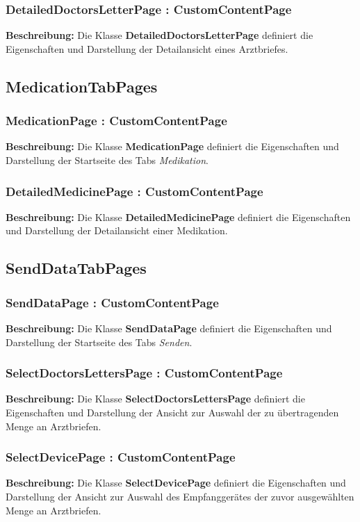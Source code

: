 \documentclass[a4paper]{scrreprt}
\begin{document}
\subsubsection{DetailedDoctorsLetterPage : CustomContentPage}
\textbf{Beschreibung:} Die Klasse \textbf{DetailedDoctorsLetterPage} definiert die Eigenschaften und Darstellung der Detailansicht eines Arztbriefes.

\subsection{MedicationTabPages}
\subsubsection{MedicationPage : CustomContentPage}
\textbf{Beschreibung:} Die Klasse \textbf{MedicationPage} definiert die Eigenschaften und Darstellung der Startseite des Tabs \textit{Medikation}.

\subsubsection{DetailedMedicinePage : CustomContentPage}
\textbf{Beschreibung:} Die Klasse \textbf{DetailedMedicinePage} definiert die Eigenschaften und Darstellung der Detailansicht einer Medikation.

\subsection{SendDataTabPages}
\subsubsection{SendDataPage : CustomContentPage}
\textbf{Beschreibung:} Die Klasse \textbf{SendDataPage} definiert die Eigenschaften und Darstellung der Startseite des Tabs \textit{Senden}.

\subsubsection{SelectDoctorsLettersPage : CustomContentPage}
\textbf{Beschreibung:} Die Klasse \textbf{SelectDoctorsLettersPage} definiert die Eigenschaften und Darstellung der Ansicht zur Auswahl der zu übertragenden Menge an Arztbriefen.

\subsubsection{SelectDevicePage : CustomContentPage}
\textbf{Beschreibung:} Die Klasse \textbf{SelectDevicePage} definiert die Eigenschaften und Darstellung der Ansicht zur Auswahl des Empfanggerätes der zuvor ausgewählten Menge an Arztbriefen.
\end{document}
